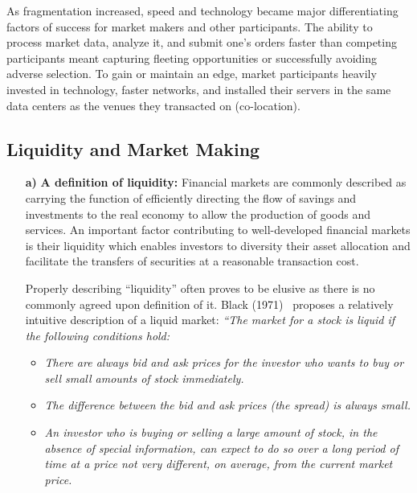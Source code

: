 As fragmentation increased, speed and technology became major differentiating factors of success for market makers and other participants. The ability to process market data, analyze it, and submit one's orders faster than competing participants meant capturing fleeting opportunities or successfully avoiding adverse selection. To gain or maintain an edge, market participants heavily invested in technology, faster networks, and installed their servers in the same data centers as the venues they transacted on (co-location). 


\subsection{Liquidity and Market Making}


\begin{enumerate}
\item[\textbf{a)}] \textbf{A definition of liquidity:} Financial markets are commonly described as carrying the function of efficiently directing the flow of savings and investments to the real economy to allow the production of goods and services. An important factor contributing to well-developed financial markets is their liquidity which enables investors to diversity their asset allocation and facilitate the transfers of securities at a reasonable transaction cost. 


Properly describing ``liquidity'' often proves to be elusive as there is no commonly agreed upon definition of it. Black (1971)~\cite{black71} proposes a relatively intuitive description of a liquid market:
\textit{``The market for a stock is liquid if the following conditions hold:}

\begin{itemize}
\item \textit{There are always bid and ask prices for the investor who wants to buy or sell small amounts of stock immediately.}

\item \textit{The difference between the bid and ask prices (the spread) is always small.}

\item \textit{An investor who is buying or selling a large amount of stock, in the absence of special information, can expect to do so over a long period of time at a price not very different, on average, from the current market price.}


\end{itemize}
\end{enumerate}
